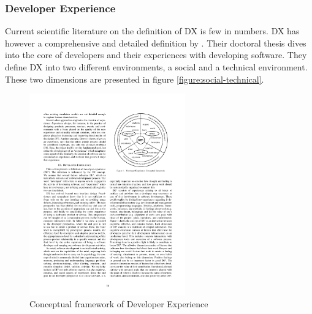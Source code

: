 \documentclass[english, 12pt, a4paper, sci, utf8, a-1b, online]{aaltothesis}
\begin{document}

\subsubsection{Developer Experience}

Current scientific literature on the definition of DX is few in numbers. DX has however a comprehensive and detailed definition by \textcite{fagerholm-doctoral-thesis}. Their doctoral thesis dives into the core of developers and their experiences with developing software. They define DX into two different environments, a social and a technical environment. These two dimensions are presented in figure \ref{figure:social-technical}.

\begin{figure}
  \captionsetup{width=0.6\textwidth}
  \caption{Conceptual framework of Developer Experience \parencite{fagerholm-dx-concept-and-definition}}
  \begin{center}
    \includegraphics[width=0.6\textwidth]{dx-conceptual.pdf}
  \end{center}
  \label{figure:conceptual-framework}
\end{figure}
\end{document}
